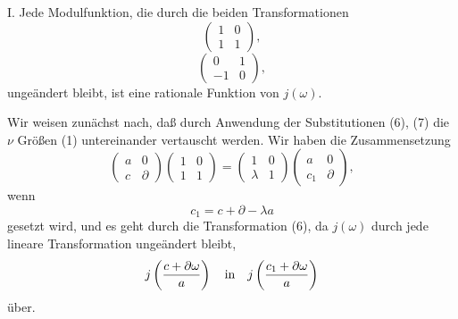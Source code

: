 \documentclass[11pt]{article}
\begin{document}
I. Jede Modulfunktion, die durch die beiden Transformationen
\begin{equation}
 \begin{pmatrix}1&0\\1&1\end{pmatrix},
\tag{6}
\end{equation}
\begin{equation}
 \begin{pmatrix}0&1\\-1&0\end{pmatrix},
\tag{7}
\end{equation}
ungeändert bleibt, ist eine rationale Funktion von $j(\omega)$.

Wir weisen zunächst nach, daß durch Anwendung der Substitutionen (6), (7) die $\nu$
Größen (1) untereinander vertauscht werden. Wir haben die Zusammensetzung
\begin{equation}
 \begin{pmatrix}a&0\\c&\partial\end{pmatrix}
 \begin{pmatrix}1&0\\1&1\end{pmatrix}
 =
 \begin{pmatrix}1&0\\\lambda&1\end{pmatrix}
 \begin{pmatrix}a&0\\c_1&\partial\end{pmatrix},
\tag{8}
\end{equation}
wenn
\begin{equation}
 c_1=c+\partial-\lambda a
\tag{9}
\end{equation}
gesetzt wird, und es geht durch die Transformation (6), da $j(\omega)$ durch jede lineare
Transformation ungeändert bleibt,
\[
 j\left({c+\partial\omega\over a}\right)
\quad\hbox{in}\quad
j\left({c_1+\partial\omega\over a}\right)
\]
über.
\end{document}
